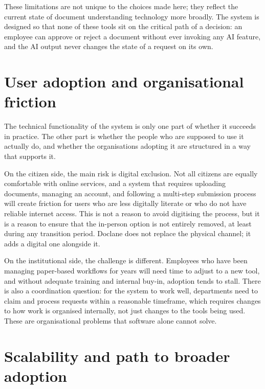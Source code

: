 \par These limitations are not unique to the choices made here; they reflect the current state of document understanding technology more broadly. The system is designed so that none of these tools sit on the critical path of a decision: an employee can approve or reject a document without ever invoking any AI feature, and the AI output never changes the state of a request on its own.

\section{User adoption and organisational friction}

\par The technical functionality of the system is only one part of whether it succeeds in practice. The other part is whether the people who are supposed to use it actually do, and whether the organisations adopting it are structured in a way that supports it.

\par On the citizen side, the main risk is digital exclusion. Not all citizens are equally comfortable with online services, and a system that requires uploading documents, managing an account, and following a multi-step submission process will create friction for users who are less digitally literate or who do not have reliable internet access. This is not a reason to avoid digitising the process, but it is a reason to ensure that the in-person option is not entirely removed, at least during any transition period. Doclane does not replace the physical channel; it adds a digital one alongside it.

\par On the institutional side, the challenge is different. Employees who have been managing paper-based workflows for years will need time to adjust to a new tool, and without adequate training and internal buy-in, adoption tends to stall. There is also a coordination question: for the system to work well, departments need to claim and process requests within a reasonable timeframe, which requires changes to how work is organised internally, not just changes to the tools being used. These are organisational problems that software alone cannot solve.

\section{Scalability and path to broader adoption}

